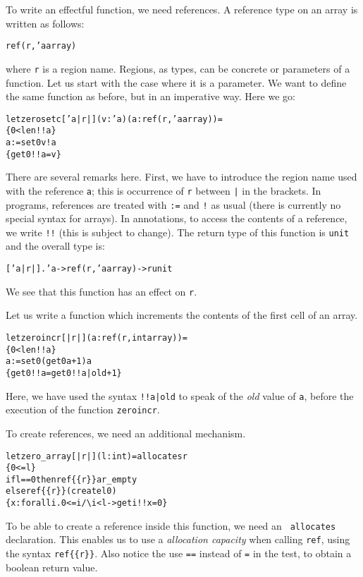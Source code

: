 \documentclass[a4paper]{scrreprt}
\begin{document}
To write an effectful function, we need references. A reference type on an
array is written as follows:
\begin{alltt}
  ref(r,'a array)
\end{alltt}
where {\tt r} is a region name. Regions, as types, can be concrete or
parameters of a function. Let us start with the case where it is a parameter.
We want to define the same function as before, but in an imperative way. Here
we go:
\begin{alltt}
  let zerosetc ['a|r|] (v : 'a) (a : ref(r,'a array)) = 
    \{ 0 < len !!a \}
    a := set 0 v !a
    \{ get 0 !!a = v \}
\end{alltt}
There are several remarks here. First, we have to introduce the region name
used with the reference {\tt a}; this is occurrence of {\tt r} between {\tt |}
in the brackets. In programs, references are treated with {\tt :=} and {\tt !}
as usual (there is currently no special syntax for arrays). In annotations, to
access the contents of a reference, we write {\tt !!} (this is subject to
change). The return type of this function is {\tt unit} and the overall type
is:
\begin{alltt}
  ['a|r|]. 'a -> ref(r,'a array) ->{r} unit
\end{alltt}
We see that this function has an effect on {\tt r}.

Let us write a function which increments the contents of the first cell of an
array.
\begin{alltt}
  let zeroincr [|r|] (a : ref(r,int array)) = 
    \{ 0 < len !!a \}
    a := set 0 (get 0 a +1) a
    \{ get 0 !!a = get 0 !!a|old + 1 \}
\end{alltt}
Here, we have used the syntax {\tt !!a|old} to speak of the {\em old} value of
{\tt a}, before the execution of the function {\tt zeroincr}.

To create references, we need an additional mechanism.
\begin{alltt}
  let zero_array [|r|] (l : int) = allocates r
    \{ 0 <= l \}
    if l == 0 then ref\{\{r\}\} ar_empty
    else ref\{\{r\}\} (create l 0)
    \{ x : forall i. 0 <= i \verb|/\| i < l -> get i !!x = 0 \}
\end{alltt}
To be able to create a reference inside this function, we need an {\tt
allocates} declaration. This enables us to use a {\em allocation capacity}
when calling {\tt ref}, using the syntax {\tt ref\{\{r\}\}}. Also notice the
use {\tt ==} instead of {\tt =} in the test, to obtain a boolean return value.
\end{document}
